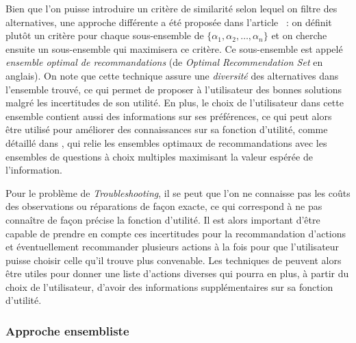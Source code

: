 \documentclass[a4paper,11pt]{article}
\theoremstyle{plain}
\theoremstyle{definition}
\begin{document}
Bien que l'on puisse introduire un critère de similarité selon lequel on filtre des alternatives, une approche différente a été proposée dans l'article \cite{price_optimal_2005}~: on définit plutôt un critère pour chaque sous-ensemble de $\{\alpha_1, \alpha_2, \dotsc, \alpha_n\}$ et on cherche ensuite un sous-ensemble qui maximisera ce critère. Ce sous-ensemble est appelé \emph{ensemble optimal de recommandations} (de \emph{Optimal Recommendation Set} en anglais). On note que cette technique assure une \emph{diversité} des alternatives dans l'ensemble trouvé, ce qui permet de proposer à l'utilisateur des bonnes solutions malgré les incertitudes de son utilité. En plus, le choix de l'utilisateur dans cette ensemble contient aussi des informations sur ses préférences, ce qui peut alors être utilisé pour améliorer des connaissances sur sa fonction d'utilité, comme détaillé dans \cite{viappiani_optimal_2005}, qui relie les ensembles optimaux de recommandations avec les ensembles de questions à choix multiples maximisant la valeur espérée de l'information. %

Pour le problème de \emph{Troubleshooting}, il se peut que l'on ne connaisse pas les coûts des observations ou réparations de façon exacte, ce qui correspond à ne pas connaître de façon précise la fonction d'utilité. Il est alors important d'être capable de prendre en compte ces incertitudes pour la recommandation d'actions et éventuellement recommander plusieurs actions à la fois pour que l'utilisateur puisse choisir celle qu'il trouve plus convenable. Les techniques de \cite{price_optimal_2005, viappiani_optimal_2005} peuvent alors être utiles pour donner une liste d'actions diverses qui pourra en plus, à partir du choix de l'utilisateur, d'avoir des informations supplémentaires sur sa fonction d'utilité.

\subsubsection{Approche ensembliste}
\end{document}
